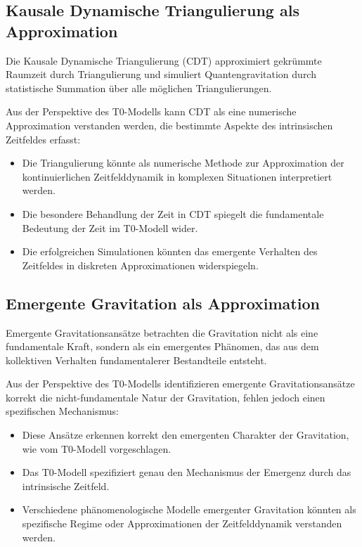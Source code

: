 \documentclass[12pt,a4paper]{article}
\begin{document}
	\subsection{Kausale Dynamische Triangulierung als Approximation}
	\label{subsec:cdt}
	
	Die Kausale Dynamische Triangulierung (CDT) approximiert gekrümmte Raumzeit durch Triangulierung und simuliert Quantengravitation durch statistische Summation über alle möglichen Triangulierungen.
	
	Aus der Perspektive des T0-Modells kann CDT als eine numerische Approximation verstanden werden, die bestimmte Aspekte des intrinsischen Zeitfeldes erfasst:
	
	\begin{itemize}
		\item Die Triangulierung könnte als numerische Methode zur Approximation der kontinuierlichen Zeitfelddynamik in komplexen Situationen interpretiert werden.
		
		\item Die besondere Behandlung der Zeit in CDT spiegelt die fundamentale Bedeutung der Zeit im T0-Modell wider.
		
		\item Die erfolgreichen Simulationen könnten das emergente Verhalten des Zeitfeldes in diskreten Approximationen widerspiegeln.
	\end{itemize}
	
	\subsection{Emergente Gravitation als Approximation}
	\label{subsec:emergent}
	
	Emergente Gravitationsansätze betrachten die Gravitation nicht als eine fundamentale Kraft, sondern als ein emergentes Phänomen, das aus dem kollektiven Verhalten fundamentalerer Bestandteile entsteht.
	
	Aus der Perspektive des T0-Modells identifizieren emergente Gravitationsansätze korrekt die nicht-fundamentale Natur der Gravitation, fehlen jedoch einen spezifischen Mechanismus:
	
	\begin{itemize}
		\item Diese Ansätze erkennen korrekt den emergenten Charakter der Gravitation, wie vom T0-Modell vorgeschlagen.
		
		\item Das T0-Modell spezifiziert genau den Mechanismus der Emergenz durch das intrinsische Zeitfeld.
		
		\item Verschiedene phänomenologische Modelle emergenter Gravitation könnten als spezifische Regime oder Approximationen der Zeitfelddynamik verstanden werden.
	\end{itemize}
	
\end{document}
